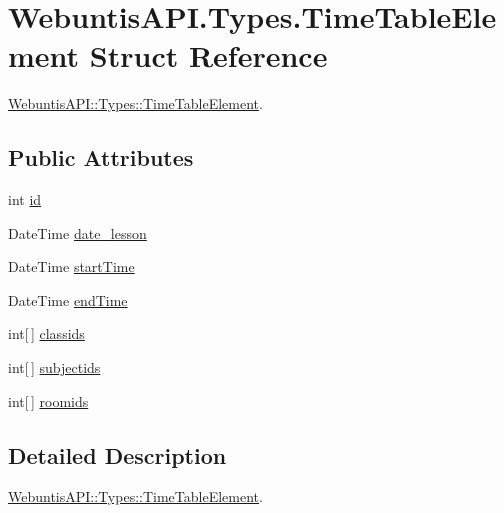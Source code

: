 \hypertarget{struct_webuntis_a_p_i_1_1_types_1_1_time_table_element}{\section{Webuntis\-A\-P\-I.\-Types.\-Time\-Table\-Element Struct Reference}
\label{struct_webuntis_a_p_i_1_1_types_1_1_time_table_element}
}


\hyperlink{struct_webuntis_a_p_i_1_1_types_1_1_time_table_element}{Webuntis\-A\-P\-I\-::\-Types\-::\-Time\-Table\-Element}.  


\subsection*{Public Attributes}
\begin{DoxyCompactItemize}
\item 
int \hyperlink{struct_webuntis_a_p_i_1_1_types_1_1_time_table_element_a3d6f4d06843dbad8ddbdbd21e2aea0b6}{id}
\item 
Date\-Time \hyperlink{struct_webuntis_a_p_i_1_1_types_1_1_time_table_element_a2ce093cea22aa8960523959541d15d02}{date\-\_\-lesson}
\item 
Date\-Time \hyperlink{struct_webuntis_a_p_i_1_1_types_1_1_time_table_element_a9a7059aea921d721fea81b09882c8b2f}{start\-Time}
\item 
Date\-Time \hyperlink{struct_webuntis_a_p_i_1_1_types_1_1_time_table_element_a0ef904dd3308b39f0ef4af265e428544}{end\-Time}
\item 
int\mbox{[}$\,$\mbox{]} \hyperlink{struct_webuntis_a_p_i_1_1_types_1_1_time_table_element_ab3f7530ba709811a0f080b9f25ee3b76}{classids}
\item 
int\mbox{[}$\,$\mbox{]} \hyperlink{struct_webuntis_a_p_i_1_1_types_1_1_time_table_element_a3603be7f40d3358ce0f1a9a0b583cae6}{subjectids}
\item 
int\mbox{[}$\,$\mbox{]} \hyperlink{struct_webuntis_a_p_i_1_1_types_1_1_time_table_element_add1b2a25e2b6c0c7cb02ef57c6b2ea6b}{roomids}
\end{DoxyCompactItemize}


\subsection{Detailed Description}
\hyperlink{struct_webuntis_a_p_i_1_1_types_1_1_time_table_element}{Webuntis\-A\-P\-I\-::\-Types\-::\-Time\-Table\-Element}. 

